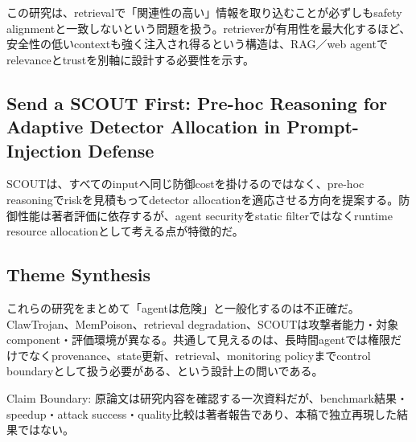 この研究は、retrievalで「関連性の高い」情報を取り込むことが必ずしもsafety alignmentと一致しないという問題を扱う。retrieverが有用性を最大化するほど、安全性の低いcontextも強く注入され得るという構造は、RAG／web agentでrelevanceとtrustを別軸に設計する必要性を示す。\autocite{src-062c2718dd96}


\subsection{Send a SCOUT First: Pre-hoc Reasoning for Adaptive Detector Allocation in Prompt-Injection Defense}

SCOUTは、すべてのinputへ同じ防御costを掛けるのではなく、pre-hoc reasoningでriskを見積もってdetector allocationを適応させる方向を提案する。防御性能は著者評価に依存するが、agent securityをstatic filterではなくruntime resource allocationとして考える点が特徴的だ。\autocite{src-b818bca6d4b6}


\subsection{Theme Synthesis}

これらの研究をまとめて「agentは危険」と一般化するのは不正確だ。ClawTrojan、MemPoison、retrieval degradation、SCOUTは攻撃者能力・対象component・評価環境が異なる。共通して見えるのは、長時間agentでは権限だけでなくprovenance、state更新、retrieval、monitoring policyまでcontrol boundaryとして扱う必要がある、という設計上の問いである。\autocite{src-062c2718dd96,src-7fa0ea6bcf47,src-b818bca6d4b6,src-f216d6cd7707}


\begin{claimboundary}
Claim Boundary: 原論文は研究内容を確認する一次資料だが、benchmark結果・speedup・attack success・quality比較は著者報告であり、本稿で独立再現した結果ではない。\autocite{src-062c2718dd96,src-7fa0ea6bcf47,src-b818bca6d4b6,src-f216d6cd7707}
\end{claimboundary}
